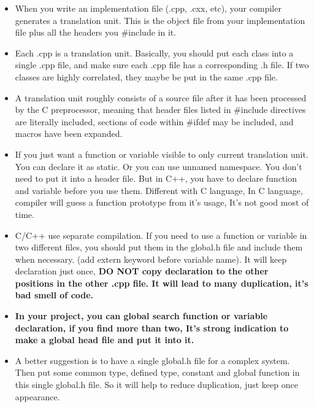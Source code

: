 \documentclass[a4paper,12pt,twoside]{book}
\begin{document}
\begin{itemize}
	
	\item When you write an implementation file (.cpp, .cxx, etc),  your compiler generates a translation unit. This is the object file from your implementation file plus all the headers you \#include in it.
	
	\item Each .cpp is a translation unit. Basically, you should put each class into a single .cpp file, and make sure each .cpp file has a corresponding .h file.  If two classes are highly correlated, they maybe be put in the same .cpp file.
	
	\item A translation unit roughly consists of a source file after it has been processed by the C preprocessor, meaning that header files listed in \#include directives are literally included, sections of code within \#ifdef may be included, and macros have been expanded.
	
	\item If you just want a function or variable visible to only current translation unit. You can declare it as static. Or you can use unnamed namespace.  You don't need to put it into a header file.  But in C++, you have to declare function and variable before you use them. Different with C language, In C language, compiler will guess a function prototype from it's usage, It's not good most of time.
	
	\item C/C++ use separate compilation. If you need to use a function or variable in two different files, you should put them in the  global.h file and include them when necessary. (add extern keyword before variable name).  It will keep declaration just once, \textbf{DO NOT copy declaration to the other positions in the other .cpp file. It will lead to many duplication, it's bad smell of code.}
	
	\item \textbf{In your project, you can global search function or variable declaration, if you find more than two, It's strong indication to make a global head file and put it into it.}
	
	\item A better suggestion is to have a single global.h file for a complex system. Then put some common type, defined type, constant and global function in this single global.h file. So it will help to reduce duplication, just keep once appearance.
	

\end{itemize}
\end{document}
